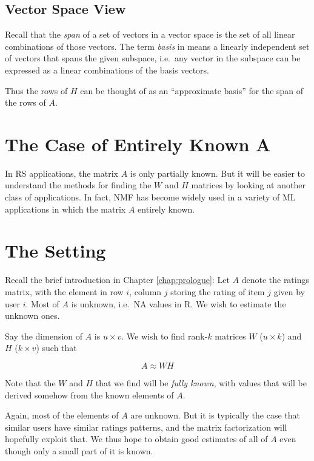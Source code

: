 \subsection{Vector Space View}

Recall that the \textit{span} of a set of vectors in a vector space is
the set of all linear combinations of those vectors.  The term
\textit{basis} in means a linearly independent set of vectors that spans
the given subspace, i.e.\ any vector in the subspace can be expressed as
a linear combinations of the basis vectors.

Thus the rows of $H$ can be thought of as an ``approximate
basis'' for the span of the rows of $A$.

\section{The Case of Entirely Known A}

In RS applications, the matrix $A$ is only partially known.  But it will
be easier to understand the methods for finding the $W$ and $H$ matrices
by looking at another class of applications.  In fact, NMF has become
widely used in a variety of ML applications in which the matrix $A$
entirely known. 







\section{The Setting}

Recall the brief introduction in Chapter \ref{chap:prologue}:  Let $A$
denote the ratings matrix, with the element in row $i$, column $j$
storing the rating of item $j$ given by user $i$.  Most of $A$ is
unknown, i.e.\ NA values in R.  We wish to estimate the unknown ones.

Say the dimension of $A$ is $u \times v$.  We wish to find rank-$k$
matrices $W$ ($u \times k$) and $H$ ($k \times v$) such that  

\begin{equation}
\label{awh}
A \approx W H
\end{equation}

Note that the $W$ and $H$ that we find will be \textit{fully known},
with values that will be derived somehow from the known elements of $A$.

Again, most of the elements of $A$ are unknown.  But it is typically the
case that similar users have similar ratings patterns, and the matrix
factorization will hopefully exploit that.  We thus hope to obtain good
estimates of all of $A$ even though only a small part of it is known.  

